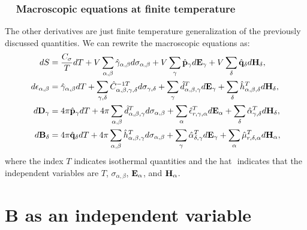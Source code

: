 \documentclass[12pt,a4paper,twoside]{report}
\begin{document}
{\subsection{\color{orange}\ \ Macroscopic equations at finite temperature}
The other derivatives are just finite temperature generalization of the
previously discussed quantities. We can rewrite the macroscopic equations as:
\begin{align}
dS&= {C_\sigma\over T} dT+ V \sum_{\alpha,\beta} \hat \gamma_{\alpha,\beta} 
d\sigma_{\alpha,\beta}
+ V \sum_\gamma \hat {\bf p}_\gamma d{\bf E}_{\gamma} + 
V \sum_\delta \hat {\bf q}_\delta d{\bf H}_{\delta}, \\
d\epsilon_{\alpha,\beta}&=  \hat \gamma_{\alpha,\beta} dT + 
\sum_{\gamma,\delta} \hat C^{-1 T}_{\alpha,\beta,\gamma,\delta} 
d \sigma_{\gamma,\delta} + \sum_\gamma \hat d^T_{\alpha,\beta,\gamma} 
d{\bf E}_{\gamma} +
\sum_\delta \hat h^T_{\alpha,\beta,\delta} d{\bf H}_{\delta}, \\
d{\bf D}_\gamma&= 
4 \pi \hat {\bf p}_\gamma dT + 4 \pi \sum_{\alpha,\beta} \hat 
d^T_{\alpha,\beta,\gamma} d\sigma_{\alpha,\beta} +
\sum_\alpha \hat \epsilon^T_{r,\gamma,\alpha} d{\bf E}_{\alpha} + 
\sum_\delta \hat \alpha^T_{\gamma,\delta} d{\bf H}_{\delta}, \\
d{\bf B}_\delta&= 
4 \pi \hat {\bf q}_\delta dT + 4 \pi \sum_{\alpha,\beta}
\hat h^T_{\alpha,\beta,\gamma}
d\sigma_{\alpha,\beta}
+\sum_\gamma \hat \alpha^T_{\delta,\gamma}
d{\bf E}_{\gamma}+ 
\sum_\alpha \hat \mu^T_{r,\delta,\alpha}
d{\bf H}_{\alpha}, 
\end{align}
where the index $T$ indicates isothermal quantities and the hat $\hat{}$
indicates that the independent variables are $T$, $\sigma_{\alpha,\beta}$, 
${\bf E}_\alpha$, and ${\bf H}_\alpha$.  
}

\newpage
{\color{dark-blue}\chapter{{\bf B} as an independent variable}}
\color{black}
\end{document}
